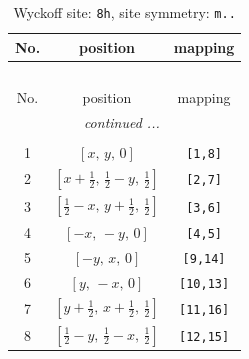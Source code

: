 \documentclass[fleqn,8pt]{jsarticle}
\begin{document}
\begin{longtable}{ccc}
\caption{Wyckoff site: {\tt 8h}, site symmetry: {\tt m..}}
 \\
 \hline \hline
No. & position & mapping \\ \hline \endfirsthead

\multicolumn{2}{l}{\tablename\ \thetable{}} \\
 \hline \hline
No. & position & mapping \\ \hline \endhead

 \hline \hline
\multicolumn{2}{r}{\footnotesize\it continued ...} \\ \endfoot

 \hline \hline
\multicolumn{2}{r}{} \\ \endlastfoot

1 & $\left[ x,\, y,\, 0 \right]$ & {\tt [1,8]} \\ \hline
2 & $\left[ x + \frac{1}{2},\, \frac{1}{2} - y,\, \frac{1}{2} \right]$ & {\tt [2,7]} \\ \hline
3 & $\left[ \frac{1}{2} - x,\, y + \frac{1}{2},\, \frac{1}{2} \right]$ & {\tt [3,6]} \\ \hline
4 & $\left[ - x,\, - y,\, 0 \right]$ & {\tt [4,5]} \\ \hline
5 & $\left[ - y,\, x,\, 0 \right]$ & {\tt [9,14]} \\ \hline
6 & $\left[ y,\, - x,\, 0 \right]$ & {\tt [10,13]} \\ \hline
7 & $\left[ y + \frac{1}{2},\, x + \frac{1}{2},\, \frac{1}{2} \right]$ & {\tt [11,16]} \\ \hline
8 & $\left[ \frac{1}{2} - y,\, \frac{1}{2} - x,\, \frac{1}{2} \right]$ & {\tt [12,15]} \\
\end{longtable}
\renewcommand{\arraystretch}{1.2}
\end{document}
